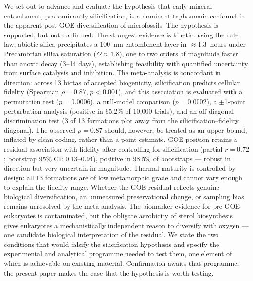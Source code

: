\documentclass[11pt]{article}
\begin{document}
We set out to advance and evaluate the hypothesis that early mineral entombment, predominantly
silicification, is a dominant taphonomic confound in the apparent post-GOE diversification of
microfossils. The hypothesis is supported, but not confirmed. The strongest evidence is kinetic:
using the \citet{Rimstidt1980} rate law, abiotic silica precipitates a 100~nm entombment layer in
$\approx$1.3~hours under Precambrian silica saturation ($\Omega \approx 1.8$), one to two orders of
magnitude faster than anoxic decay (3--14 days), establishing feasibility with quantified uncertainty
from surface catalysis and inhibition. The meta-analysis is concordant in direction: across 13 biotas
of accepted biogenicity, silicification predicts cellular fidelity (Spearman $\rho = 0.87$,
$p < 0.001$), and this association is evaluated with a permutation test ($p = 0.0006$), a null-model
comparison ($p = 0.0002$), a $\pm$1-point perturbation analysis (positive in 95.2\% of 10{,}000
trials), and an off-diagonal discrimination test (3 of 13 formations plot away from the
silicification--fidelity diagonal). The observed $\rho = 0.87$ should, however, be treated as an upper
bound, inflated by clean coding, rather than a point estimate. GOE position retains a residual
association with fidelity after controlling for silicification (partial $r = 0.72$; bootstrap 95\% CI:
0.13--0.94), positive in 98.5\% of bootstraps --- robust in direction but very uncertain in magnitude.
Thermal maturity is controlled by design: all 13 formations are of low metamorphic grade and cannot
vary enough to explain the fidelity range. Whether the GOE residual reflects genuine biological
diversification, an unmeasured preservational change, or sampling bias remains unresolved by the
meta-analysis. The biomarker evidence for pre-GOE eukaryotes is contaminated, but the obligate
aerobicity of sterol biosynthesis gives eukaryotes a mechanistically independent reason to diversify
with oxygen --- one candidate biological interpretation of the residual. We state the two conditions
that would falsify the silicification hypothesis and specify the experimental and analytical programme
needed to test them, one element of which is achievable on existing material. Confirmation awaits
that programme; the present paper makes the case that the hypothesis is worth testing.
\end{document}
